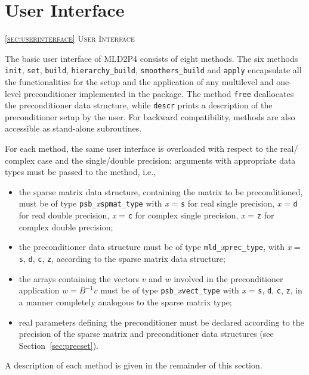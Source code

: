 \section{User Interface\label{sec:userinterface}}
         {\textsc{\ref{sec:userinterface} User Interface}}

The basic user interface of MLD2P4 consists of eight methods. The six 
methods \verb|init|, \verb|set|, \verb|build|, 
\verb|hierarchy_build|, \verb|smoothers_build| and \verb|apply|
encapsulate all the functionalities for the setup and the application
of any multilevel and one-level preconditioner implemented in the
package.  
The method \verb|free| deallocates the preconditioner data structure, while
\verb|descr| prints a description of the preconditioner setup by the user.
For backward compatibility,  methods are also accessible as
stand-alone subroutines.

For each method, the same user interface is overloaded with
respect to the real/ complex case and the single/double precision;
arguments with appropriate data types must be passed to the method,
i.e.,
\begin{itemize}
\item the sparse matrix data structure, containing the matrix to be
  preconditioned, must be of type \verb|psb_|\emph{x}\verb|spmat_type|
	with \emph{x} = \verb|s| for real single precision, \emph{x} = \verb|d|
	for real double precision, \emph{x} = \verb|c| for complex single precision,
	\emph{x} = \verb|z| for complex double precision;
\item the preconditioner data structure must be of type
  \verb|mld_|\emph{x}\verb|prec_type|, with \emph{x} =    
  \verb|s|, \verb|d|, \verb|c|, \verb|z|, according to the sparse
  matrix data structure;
\item the arrays containing the vectors $v$ and $w$ involved in
  the preconditioner application $w=B^{-1}v$ must be of type   
  \verb|psb_|\emph{x}\verb|vect_type| with \emph{x} =    
  \verb|s|, \verb|d|, \verb|c|, \verb|z|, in a manner completely
  analogous to the sparse matrix type;
\item real parameters defining the preconditioner must be declared
  according to the precision of the sparse matrix and preconditioner
  data structures (see Section~\ref{sec:precset}).
\end{itemize}
A description of each method is given in the remainder of this section.

\clearpage


